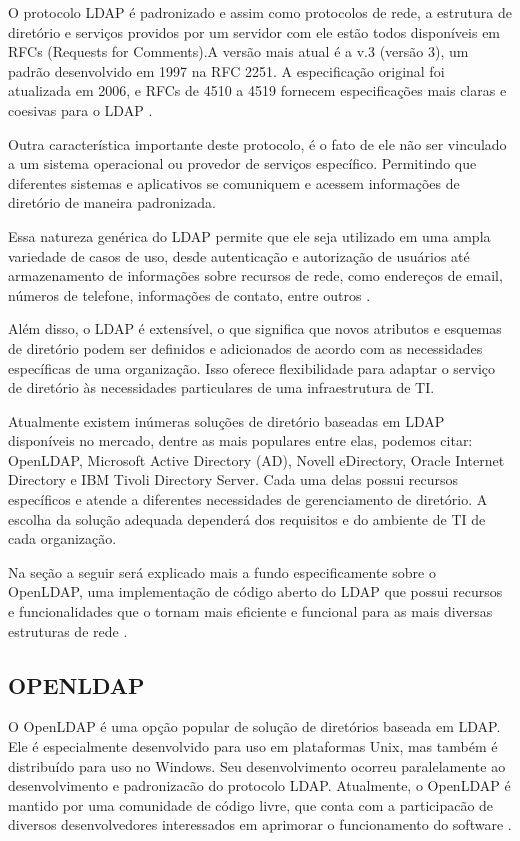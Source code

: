O  protocolo  LDAP  é  padronizado  e assim  como  protocolos  de  rede,  a estrutura  de  diretório  e  serviços  providos  por  um  servidor com ele estão  todos disponíveis em RFCs (Requests for Comments).A versão mais atual é a v.3 (versão 3), um padrão desenvolvido em 1997 na RFC 2251. A especificação original foi atualizada em 2006, e RFCs de 4510 a 4519 fornecem especificações mais claras e coesivas para o LDAP \cite{lima2021estudo}.

Outra característica importante deste protocolo, é o fato de ele não ser vinculado a um sistema operacional ou provedor de serviços específico. Permitindo que diferentes sistemas e aplicativos se comuniquem e acessem informações de diretório de maneira padronizada.

Essa natureza genérica do LDAP permite que ele seja utilizado em uma ampla variedade de casos de uso, desde autenticação e autorização de usuários até armazenamento de informações sobre recursos de rede, como endereços de email, números de telefone, informações de contato, entre outros \cite{universidade-fumec}.

Além disso, o LDAP é extensível, o que significa que novos atributos e esquemas de diretório podem ser definidos e adicionados de acordo com as necessidades específicas de uma organização. Isso oferece flexibilidade para adaptar o serviço de diretório às necessidades particulares de uma infraestrutura de TI.

Atualmente existem inúmeras soluções de diretório baseadas em LDAP disponíveis no mercado, dentre as mais populares entre elas, podemos citar: OpenLDAP, Microsoft Active Directory (AD), Novell eDirectory, Oracle Internet Directory e IBM Tivoli Directory Server. Cada uma delas possui recursos específicos e atende a diferentes necessidades de gerenciamento de diretório. A escolha da solução adequada dependerá dos requisitos e do ambiente de TI de cada organização.

Na seção a seguir será explicado mais a fundo especificamente sobre o OpenLDAP, uma implementação de código aberto do LDAP que possui recursos e funcionalidades que o tornam mais eficiente e funcional para as mais diversas estruturas de rede \cite{ninjadolinux}.

\subsection{OPENLDAP}

O OpenLDAP é uma opção popular de solução de diretórios baseada em LDAP. Ele é especialmente desenvolvido para uso em plataformas Unix, mas também é distribuído para uso no Windows. Seu desenvolvimento ocorreu paralelamente ao desenvolvimento e padronizacão do protocolo LDAP. Atualmente, o OpenLDAP é mantido por uma comunidade de código livre, que conta com a participacão de diversos desenvolvedores interessados em aprimorar o funcionamento do software \cite{oliveira2010}.

